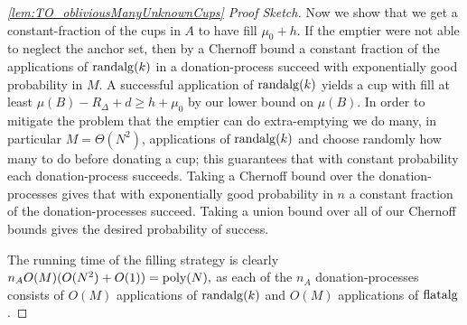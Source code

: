 \begin{proof}[\cref{lem:TO_obliviousManyUnknownCups} Proof Sketch]
Now we show that we get a constant-fraction of the cups in $A$ to
have fill $\mu_0 + h$. If the emptier were not able to neglect
the anchor set, then by a Chernoff bound a constant fraction of
the applications of $\operatorname{\text{\textup{randalg}}}(k)$ in a donation-process succeed
with exponentially good probability in $M$. A successful
application of $\operatorname{\text{\textup{randalg}}}(k)$ yields a cup with fill at least
$\mu(B) - R_\Delta + d \ge h+\mu_0$ by our lower bound on
$\mu(B)$. In order to mitigate the problem that the emptier can
do extra-emptying we do many, in particular $M=\Theta(N^2)$,
applications of $\operatorname{\text{\textup{randalg}}}(k)$ and choose randomly how many to do
before donating a cup; this guarantees that with constant
probability each donation-process succeeds. Taking a 
Chernoff bound over the donation-processes gives that with
exponentially good probability in $n$ a constant fraction of the
donation-processes succeed. Taking a union bound over all of our
Chernoff bounds gives the desired probability of success. 

The running time of the filling strategy is clearly $n_A O(M) (
O(N^2) + O(1)) = \operatorname{\text{poly}}(N),$ as each of the $n_A$
donation-processes consists of $O(M)$ applications of
$\operatorname{\text{\textup{randalg}}}(k)$ and $O(M)$ applications of $\operatorname{\text{\textup{flatalg}}}$.

\end{proof}

